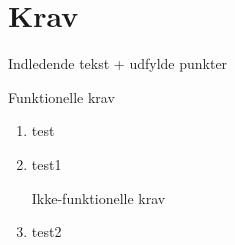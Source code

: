 \documentclass[../main.tex]{subfiles}
\begin{document}
\section{Krav}
\begin{flushleft}
\TODO Indledende tekst + udfylde punkter
\end{flushleft}

{\Large Funktionelle krav}

\begin{enumerate}
   \item test
   \item test1

\hfill

{\Large Ikke-funktionelle krav}

   \item test2
\end{enumerate}

\hfill
\end{document}
